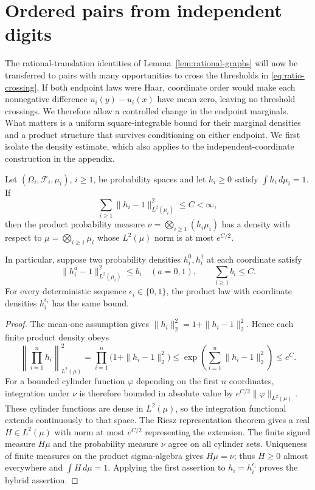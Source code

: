 \section{Ordered pairs from independent digits}
\label{sec:couplings}

The rational-translation identities of Lemma~\ref{lem:rational-graphs}
will now be transferred to pairs with many opportunities to cross the
thresholds in \eqref{eq:ratio-crossing}. If both endpoint laws were Haar,
coordinate order would make each nonnegative difference $u_i(y)-u_i(x)$
have mean zero, leaving no threshold crossings. We therefore allow a
controlled change in the endpoint marginals. What matters is a uniform
square-integrable bound for their marginal
densities and a product structure that survives conditioning on either
endpoint. We first isolate the density estimate, which also applies to
the independent-coordinate construction in the appendix.

\begin{lemma}
\label{lem:product-density-bound}
Let $(\Omega_i,\mathcal F_i,\mu_i)$, $i\ge1$, be probability spaces and
let $h_i\ge0$ satisfy $\int h_i\,d\mu_i=1$. If
\[
 \sum_{i\ge1}\|h_i-1\|_{L^2(\mu_i)}^2\le C<\infty,
\]
then the product probability measure
$\nu=\bigotimes_{i\ge1}(h_i\mu_i)$ has a density with respect to
$\mu=\bigotimes_{i\ge1}\mu_i$ whose $L^2(\mu)$ norm is at most
$e^{C/2}$.

In particular, suppose two probability densities $h_i^0,h_i^1$ at each coordinate
satisfy
\[
 \|h_i^a-1\|_{L^2(\mu_i)}^2\le b_i\quad(a=0,1),
 \qquad \sum_{i\ge1}b_i\le C.
\]
For every deterministic sequence $\epsilon_i\in\{0,1\}$, the product
law with coordinate densities $h_i^{\epsilon_i}$ has the same bound.
\end{lemma}

\begin{proof}
The mean-one assumption gives
$\|h_i\|_2^2=1+\|h_i-1\|_2^2$. Hence each finite product density obeys
\[
 \left\|\prod_{i=1}^n h_i\right\|_{L^2(\mu)}^2
 =\prod_{i=1}^n\bigl(1+\|h_i-1\|_2^2\bigr)
 \le \exp\left(\sum_{i=1}^n\|h_i-1\|_2^2\right)\le e^C.
\]
For a bounded cylinder function $\varphi$ depending on the first $n$
coordinates, integration under $\nu$ is therefore bounded in absolute
value by $e^{C/2}\|\varphi\|_{L^2(\mu)}$. These cylinder functions are
dense in $L^2(\mu)$, so the integration functional extends continuously
to that space. The Riesz representation theorem gives a real
$H\in L^2(\mu)$ with norm at most $e^{C/2}$ representing the extension.
The finite signed measure $H\mu$ and the probability measure $\nu$
agree on all cylinder sets. Uniqueness of finite measures on the
product sigma-algebra gives $H\mu=\nu$; thus $H\ge0$ almost everywhere
and $\int H\,d\mu=1$. Applying the first assertion to
$h_i=h_i^{\epsilon_i}$ proves the hybrid assertion.
\end{proof}

